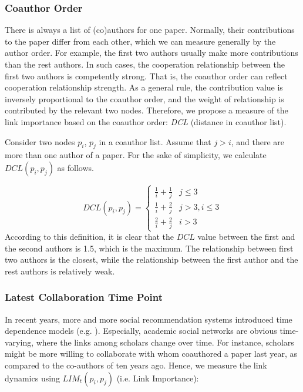 \documentclass[10pt,journal,compsoc]{IEEEtran}
\begin{document}
\subsubsection{Coauthor Order}
There is always a list of (co)authors for one paper. Normally, their contributions to the paper differ from each other, which we can measure generally by the author order. For example, the first two authors usually make more contributions than the rest authors. In such cases, the cooperation relationship between the first two authors is competently strong. That is, the coauthor order can reflect cooperation relationship strength. As a general rule, the contribution value is inversely proportional to the coauthor order, and the weight of relationship is contributed by the relevant two nodes. Therefore, we propose a measure of the link importance based on the coauthor order: \emph{DCL} (distance in coauthor list).

Consider two nodes $p_{i}$, $p_{j}$ in a coauthor list. Assume that $j > i$, and there are more than one author of a paper. For the sake of simplicity, we calculate $DCL(p_{i}, p_{j})$ as follows.

\begin{equation}
DCL(p_{i}, p_{j})=\left\{\begin{array}{ll}
\frac{1}{i}+\frac{1}{j} & j\leq 3\\
\frac{1}{i}+\frac{2}{j} & j>3, i\leq 3\\
\frac{2}{i}+\frac{2}{j} & i>3
\end{array}\right.
\end{equation}
According to this definition, it is clear that the $DCL$ value between the first and the second authors is 1.5, which is the maximum. The relationship between first two authors is the closest, while the relationship between the first author and the rest authors is relatively weak.

\subsubsection{Latest Collaboration Time Point}
In recent years, more and more social recommendation systems introduced time dependence models (e.g. \cite{toscher2009bigchaos}). Especially, academic social networks are obvious time-varying, where the links among scholars change over time. For instance, scholars might be more willing to collaborate with whom coauthored a paper last year, as compared to the co-authors of ten years ago. Hence, we measure the link dynamics using $LIM_{t}(p_{i}, p_{j})$ (i.e. Link Importance):
\end{document}
